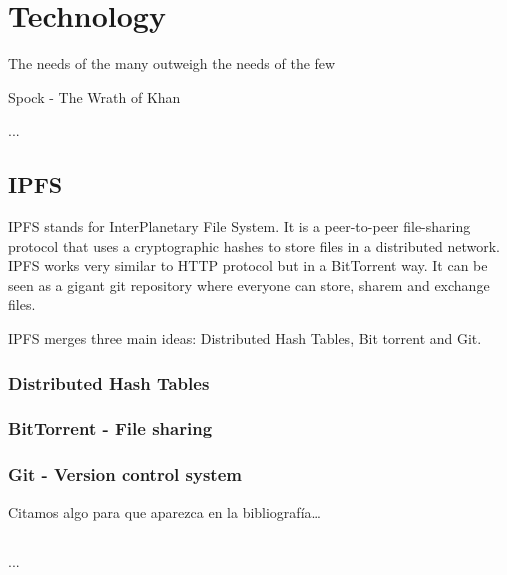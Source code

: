 \chapter{Technology}

\begin{FraseCelebre}
\begin{Frase}
The needs of the many outweigh the needs of the few
\end{Frase}
\begin{Fuente}
Spock - The Wrath of Khan
\end{Fuente}
\end{FraseCelebre}

\begin{resumen}
...
\end{resumen}


\section{IPFS}
\label{tech:sec:ipfs}
IPFS stands for InterPlanetary File System. It is a peer-to-peer file-sharing protocol that uses a cryptographic hashes to store files in a distributed network. IPFS works very similar to HTTP protocol but in a BitTorrent way. It can be seen as a gigant git repository where everyone can store, sharem and exchange files\cite{benet2014ipfs}.

IPFS merges three main ideas: Distributed Hash Tables, Bit torrent and Git.

\subsection{Distributed Hash Tables}
\subsection{BitTorrent - File sharing}
\subsection{Git - Version control system}


Citamos algo para que aparezca en la bibliografía\ldots

\medskip

\section*{\ProximoCapitulo}
\TocProximoCapitulo

...

